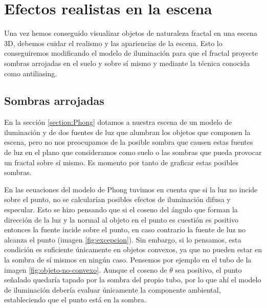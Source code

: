 \section{Efectos realistas en la escena}

Una vez hemos conseguido visualizar objetos de naturaleza fractal en una escena 3D, debemos cuidar el realismo y las apariencias de la escena. Esto lo conseguiremos modificando el modelo de iluminación para que el fractal proyecte sombras arrojadas en el suelo y sobre sí mismo y mediante la técnica conocida como antiliasing.

\subsection{Sombras arrojadas}
\label{subsection:sombras}

En la sección \ref{section:Phong} dotamos a nuestra escena de un modelo de iluminación y de dos fuentes de luz que alumbran los objetos que componen la escena, pero no nos preocupamos de la posible sombra que causen estas fuentes de luz en el plano que consideramos como suelo o las sombras que pueda provocar un fractal sobre sí mismo. Es momento por tanto de graficar estas posibles sombras.

En las ecuaciones del modelo de Phong tuvimos en cuenta que si la luz no incide sobre el punto, no se calcularían posibles efectos de iluminación difusa y especular. Esto se hizo pensando que si el coseno del ángulo que forman la dirección de la luz y la normal al objeto en el punto es cuestión es positivo entonces la fuente incide sobre el punto, en caso contrario la fuente de luz no alcanza el punto (imagen \ref{fig:excepcion}). Sin embargo, si lo pensamos, esta condición es suficiente únicamente en objetos convexos, ya que no pueden estar en la sombra de sí mismos en ningún caso. Pensemos por ejemplo en el tubo de la imagen \ref{fig:objeto-no-convexo}. Aunque el coseno de $\theta$ sea positivo, el punto señalado quedaría tapado por la sombra del propio tubo, por lo que ahí el modelo de iluminación debería evaluar únicamente la componente ambiental, estableciendo que el punto está en la sombra.

